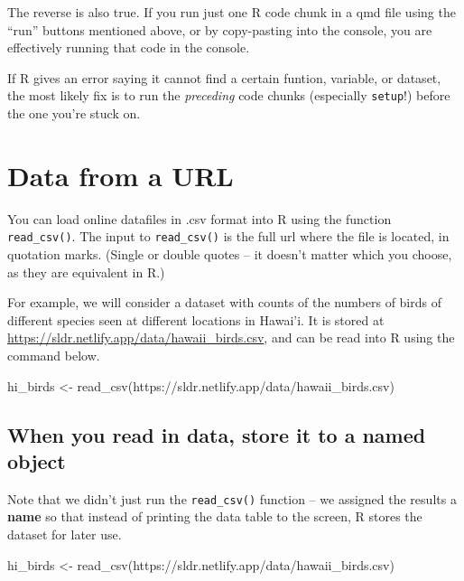\documentclass[
  letterpaper,
  DIV=11,
  numbers=noendperiod]{scrreprt}
\newenvironment{Shaded}{\begin{snugshade}}{\end{snugshade}}
\newcommand{\FunctionTok}[1]{\textcolor[rgb]{0.28,0.35,0.67}{#1}}
\newcommand{\NormalTok}[1]{\textcolor[rgb]{0.00,0.23,0.31}{#1}}
\newcommand{\OtherTok}[1]{\textcolor[rgb]{0.00,0.23,0.31}{#1}}
\newcommand{\StringTok}[1]{\textcolor[rgb]{0.13,0.47,0.30}{#1}}
\theoremstyle{remark}
\begin{document}
The reverse is also true. If you run just one R code chunk in a qmd file
using the ``run'' buttons mentioned above, or by copy-pasting into the
console, you are effectively running that code in the console.

If R gives an error saying it cannot find a certain funtion, variable,
or dataset, the most likely fix is to run the \emph{preceding} code
chunks (especially \texttt{setup}!) before the one you're stuck on.

\section{Data from a URL}\label{data-from-a-url}

You can load online datafiles in .csv format into R using the function
\texttt{read\_csv()}. The input to \texttt{read\_csv()} is the full url
where the file is located, in quotation marks. (Single or double quotes
-- it doesn't matter which you choose, as they are equivalent in R.)

For example, we will consider a dataset with counts of the numbers of
birds of different species seen at different locations in Hawai'i. It is
stored at \url{https://sldr.netlify.app/data/hawaii_birds.csv}, and can
be read into R using the command below.

\begin{Shaded}
\begin{Highlighting}[]
\NormalTok{hi\_birds }\OtherTok{\textless{}{-}} \FunctionTok{read\_csv}\NormalTok{(}\StringTok{\textquotesingle{}https://sldr.netlify.app/data/hawaii\_birds.csv\textquotesingle{}}\NormalTok{)}
\end{Highlighting}
\end{Shaded}

\subsection{When you read in data, store it to a named
object}\label{when-you-read-in-data-store-it-to-a-named-object}

Note that we didn't just run the \texttt{read\_csv()} function -- we
assigned the results a \textbf{name} so that instead of printing the
data table to the screen, R stores the dataset for later use.

\begin{Shaded}
\begin{Highlighting}[]
\NormalTok{hi\_birds }\OtherTok{\textless{}{-}} \FunctionTok{read\_csv}\NormalTok{(}\StringTok{\textquotesingle{}https://sldr.netlify.app/data/hawaii\_birds.csv\textquotesingle{}}\NormalTok{)}
\end{Highlighting}
\end{Shaded}
\end{document}

